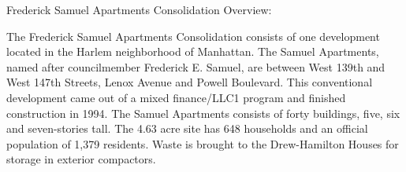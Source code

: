 Frederick Samuel Apartments Consolidation Overview:

The Frederick Samuel Apartments Consolidation consists of one development located in the Harlem neighborhood of Manhattan. The Samuel Apartments, named after councilmember Frederick E. Samuel,  are between West 139th and West 147th Streets, Lenox Avenue and Powell Boulevard. This conventional development came out of a mixed finance/LLC1 program and finished construction in 1994. The Samuel Apartments consists of forty buildings, five, six and seven-stories tall. The 4.63 acre site has 648 households and an official population of 1,379 residents. Waste is brought to the Drew-Hamilton Houses for storage in exterior compactors.